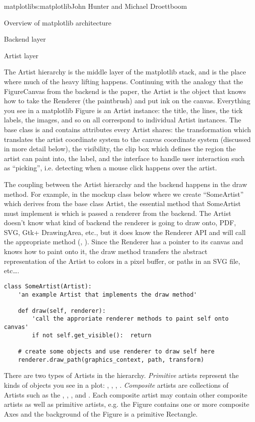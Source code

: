 \begin{aosachapter}{matplotlib}{s:matplotlib}{John Hunter and Michael Droettboom}
\begin{aosasect1}{Overview of matplotlib architecture}
\begin{aosasect2}{Backend layer}
\end{aosasect2}

\begin{aosasect2}{Artist layer}

The Artist hierarchy is the middle layer of the matplotlib stack, and
is the place where much of the heavy lifting happens.  Continuing with
the analogy that the FigureCanvas from the backend is the paper, the
Artist is the object that knows how to take the Renderer (the
paintbrush) and put ink on the canvas.  Everything you see in a
matplotlib Figure is an Artist instance: the title, the lines, the
tick labels, the images, and so on all correspond to individual Artist
instances.  The base class is  and
contains attributes every Artist shares: the transformation which
translates the artist coordinate system to the canvas coordinate
system (discussed in more detail below), the visibility, the clip box
which defines the region the artist can paint into, the label, and the
interface to handle user interaction such as ``picking'', i.e. detecting
when a mouse click happens over the artist.

The coupling between the Artist hierarchy and the backend happens in
the draw method.  For example, in the mockup class below where we
create ``SomeArtist'' which derives from the base class Artist, the
essential method that SomeArtist must implement is  which
is passed a renderer from the backend.  The Artist doesn't know what
kind of backend the renderer is going to draw onto, PDF, SVG, Gtk+
DrawingArea, etc., but it does know the Renderer API and will call the
appropriate method (, ).  Since the
Renderer has a pointer to its canvas and knows how to paint onto it,
the draw method transfers the abstract representation of the Artist to
colors in a pixel buffer, or paths in an SVG file, etc\dots{}.

\begin{verbatim}
class SomeArtist(Artist):
    'an example Artist that implements the draw method'

    def draw(self, renderer):
        'call the approriate renderer methods to paint self onto canvas'
        if not self.get_visible():  return

	# create some objects and use renderer to draw self here
	renderer.draw_path(graphics_context, path, transform)

\end{verbatim}

There are two types of Artists in the hierarchy. \emph{Primitive}
artists represent the kinds of objects you see in a plot:
, , , .
\emph{Composite} artists are collections of Artists such as the
, , , and .  Each
composite artist may contain other composite artists as well as
primitive artists, e.g. the Figure contains one or more composite Axes
and the background of the Figure is a primitive Rectangle.


\end{aosasect2}
\end{aosasect1}
\end{aosachapter}
